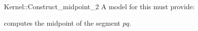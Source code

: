 \begin{ccRefFunctionObjectConcept}{Kernel::Construct_midpoint_2}
A model for this must provide:


 {computes the midpoint of the segment $pq$.}

\ccIsModel{}

\end{ccRefFunctionObjectConcept}
